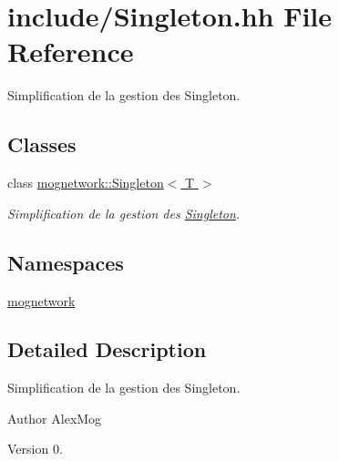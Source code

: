 \hypertarget{_singleton_8hh}{\section{include/\-Singleton.hh File Reference}
\label{_singleton_8hh}
}


Simplification de la gestion des Singleton.  


\subsection*{Classes}
\begin{DoxyCompactItemize}
\item 
class \hyperlink{classmognetwork_1_1_singleton}{mognetwork\-::\-Singleton$<$ T $>$}
\begin{DoxyCompactList}\small\item\em Simplification de la gestion des \hyperlink{classmognetwork_1_1_singleton}{Singleton}. \end{DoxyCompactList}\end{DoxyCompactItemize}
\subsection*{Namespaces}
\begin{DoxyCompactItemize}
\item 
\hyperlink{namespacemognetwork}{mognetwork}
\end{DoxyCompactItemize}


\subsection{Detailed Description}
Simplification de la gestion des Singleton. \begin{DoxyAuthor}{Author}
Alex\-Mog 
\end{DoxyAuthor}
\begin{DoxyVersion}{Version}
0. 
\end{DoxyVersion}
